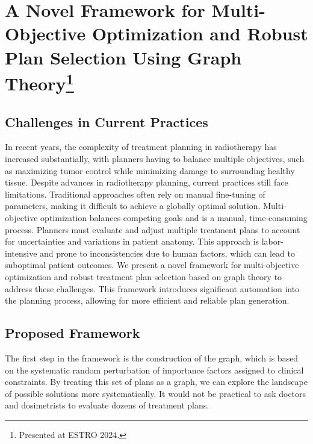 

\section[Novel Dosimetry Automation Approach with Graph Theory]{A Novel Framework for Multi-Objective Optimization and Robust Plan Selection Using Graph Theory\footnote{Presented at ESTRO 2024.}}

\subsection{Challenges in Current Practices}
In recent years, the complexity of treatment planning in radiotherapy has increased substantially, with planners having to balance multiple objectives, such as maximizing tumor control while minimizing damage to surrounding healthy tissue.
Despite advances in radiotherapy planning, current practices still face limitations.
Traditional approaches often rely on manual fine-tuning of parameters, making it difficult to achieve a globally optimal solution.
Multi-objective optimization balances competing goals and is a manual, time-consuming process.
Planners must evaluate and adjust multiple treatment plans to account for uncertainties and variations in patient anatomy.
This approach is labor-intensive and prone to inconsistencies due to human factors, which can lead to suboptimal patient outcomes.
We present a novel framework for multi-objective optimization and robust treatment plan selection based on graph theory to address these challenges.
This framework introduces significant automation into the planning process, allowing for more efficient and reliable plan generation.

\subsection{Proposed Framework}
The first step in the framework is the construction of the graph, which is based on the systematic random perturbation of importance factors assigned to clinical constraints.
By treating this set of plans as a graph, we can explore the landscape of possible solutions more systematically.
It would not be practical to ask doctors and dosimetrists to evaluate dozens of treatment plans.

